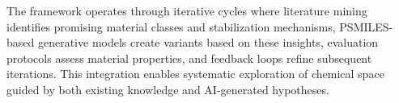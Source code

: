 \documentclass[%
 reprint,
 amsmath,amssymb,
 aps,
]{revtex4-2}
\begin{document}
The framework operates through iterative cycles where literature mining identifies promising material classes and stabilization mechanisms, PSMILES-based generative models create variants based on these insights, evaluation protocols assess material properties, and feedback loops refine subsequent iterations. This integration enables systematic exploration of chemical space guided by both existing knowledge and AI-generated hypotheses.

\end{document}
